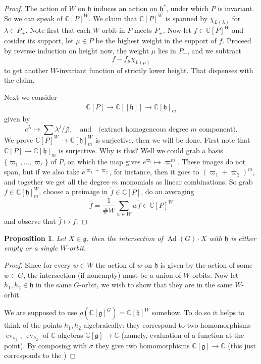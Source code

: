 \documentclass[12pt]{article}
\theoremstyle{plain}
\newtheorem{prop}[thm]{Proposition}
\theoremstyle{definition}
\numberwithin{equation}{section}
\DeclareMathOperator{\Ad}{Ad}
\DeclareMathOperator{\ev}{ev}
\newcommand{\what}[1]{\widehat{#1}}
\newcommand{\wtil}[1]{\widetilde{#1}}
\newcommand{\la}{\lambda}
\newcommand{\C}{\mathbb{C}}
\newcommand{\g}{\mathfrak{g}}
\newcommand{\h}{\mathfrak{h}}
\begin{document}
\begin{proof}
The action of $W$ on $\h$ induces an action on $\h^*$, under which $P$ is invariant. So we can speak of $\C[P]^W$. We claim that $\C[P]^W$ is spanned by $\chi_{L(\la)}$ for $\la \in P_+$. Note first that each $W$-orbit in $P$ meets $P_+$. Now let $f \in \C[P]^W$ and cosider its support, let $\mu \in P$ be the highest weight in the support of $f$. Proceed by reverse induction on height now, the weight $\mu$ lies in $P_+$, and we subtract
\[
f - f_\mu \chi_{L(\mu)}
\]
to get another $W$-invariant function of strictly lower height. That dispenses with the claim.

Next we consider
\begin{align*}
\C[P] \rightarrow \C[[\h]] \rightarrow \C[\h]_m
\end{align*}
given by
\[
e^{\la} \mapsto \sum \la^j / j!, \quad \text{and} \quad \text{(extract homogeneous degree $m$ component)}.
\]
We prove $\C[P]^W \rightarrow \C[\h]_m^W$ is surjective, then we will be done. First note that $\C[P] \rightarrow \C[\h]_m$ is surjective. Why is this? Well we could grab a basis $\{\varpi_1, \ldots, \varpi_\ell\}$ of $P$, on which the map gives $e^{\varpi_i} \mapsto \varpi_i^m$. These images do not span, but if we also take $e^{\varpi_1 + \varpi_2}$, for instance, then it goes to $(\varpi_1+\varpi_2)^m$, and together we get all the degree $m$ monomials as linear combinations. So grab $f \in \C[\h]_m^W$, choose a preimage in $\wtil{f} \in \C[P]$, do an averaging
\[
\what{f} = \frac{1}{\# W} \sum_{w \in W} w \wtil{f} \in \C[P]^W
\]
and observe that $\what{f} \mapsto f$.
\end{proof}

\begin{prop}
Let $X \in \g$, then the intersection of $\Ad(G) \cdot X$ with $\h$ is either empty or a single $W$-orbit.
\end{prop}

\begin{proof}
Since for every $w \in W$ the action of $w$ on $\h$ is given by the action of some $\wtil w \in G$, the intersection (if nonempty) must be a union of $W$-orbits. Now let $h_1, h_2 \in \h$ in the same $G$-orbit, we wish to show that they are in the same $W$-orbit.

We are supposed to use $\rho(\C[\g]^G) = \C[\h]^W$ somehow. To do so it helps to think of the points $h_1, h_2$ algebraically: they correspond to two homomorphisms $\ev_{h_1}$, $\ev_{h_2}$ of $\C$-algebras $\C[\g] \rightarrow \C$ (namely, evaluation of a function at the point). By composing with $\sigma$ they give two homomorphisms $\C[\g] \rightarrow \C$ (this just corresponds to the )
\end{proof}
\end{document}

